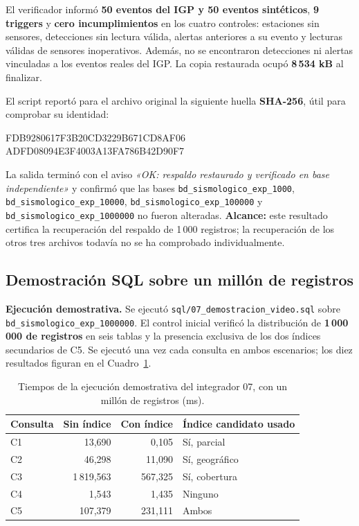 \documentclass[12pt,a4paper]{article}
\begin{document}
El verificador informó \textbf{50 eventos del IGP y 50 eventos
sintéticos}, \textbf{9 triggers} y \textbf{cero incumplimientos}
en los cuatro controles: estaciones sin sensores, detecciones
sin lectura válida, alertas anteriores a su evento y lecturas
válidas de sensores inoperativos. Además, no se encontraron
detecciones ni alertas vinculadas a los eventos reales del IGP.
La copia restaurada ocupó \textbf{8\,534 kB} al finalizar.

El script reportó para el archivo original la siguiente huella
\textbf{SHA-256}, útil para comprobar su identidad:
\begin{center}
\footnotesize\ttfamily
FDB9280617F3B20CD3229B671CD8AF06\\
ADFD08094E3F4003A13FA786B42D90F7
\end{center}

La salida terminó con el aviso \emph{«OK: respaldo restaurado
y verificado en base independiente»} y confirmó que las bases
\nolinkurl{bd_sismologico_exp_1000},
\nolinkurl{bd_sismologico_exp_10000},
\nolinkurl{bd_sismologico_exp_100000} y
\nolinkurl{bd_sismologico_exp_1000000} no fueron alteradas.
\textbf{Alcance:} este resultado certifica la recuperación del
respaldo de 1\,000 registros; la recuperación de los otros tres
archivos todavía no se ha comprobado individualmente.

\Needspace{0.33\textheight}
\subsection{Demostración SQL sobre un millón de registros}

\textbf{Ejecución demostrativa.} Se ejecutó
\texttt{sql/07\_demostracion\_video.sql} sobre
\nolinkurl{bd_sismologico_exp_1000000}. El control inicial verificó
la distribución de \textbf{1\,000\,000 de registros} en seis tablas
y la presencia exclusiva de los dos índices secundarios de C5.
Se ejecutó una vez cada consulta en ambos escenarios; los diez
resultados figuran en el Cuadro~\ref{tab:video-demostracion-62}.

\begin{table}[H]
\centering\small
\setlength{\tabcolsep}{6pt}
\begin{tabular}{lrrl}
\toprule
\textbf{Consulta} & \textbf{Sin índice} & \textbf{Con índice} & \textbf{Índice candidato usado} \\
\midrule
C1 & 13,690 & 0,105 & Sí, parcial \\
C2 & 46,298 & 11,090 & Sí, geográfico \\
C3 & 1\,819,563 & 567,325 & Sí, cobertura \\
C4 & 1,543 & 1,435 & Ninguno \\
C5 & 107,379 & 231,111 & Ambos \\
\bottomrule
\end{tabular}

\caption{Tiempos de la ejecución demostrativa del integrador 07, con un millón de registros (ms).}
\label{tab:video-demostracion-62}
\end{table}
\end{document}

